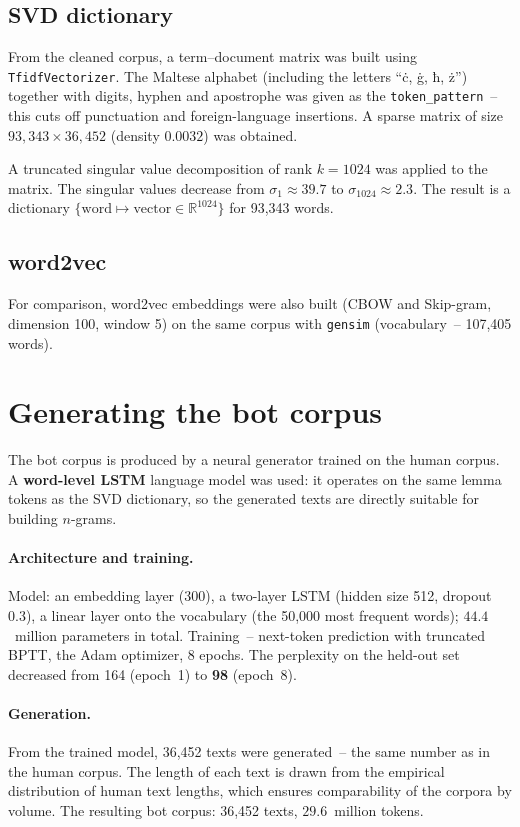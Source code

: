 \documentclass[12pt,a4paper]{article}
\begin{document}
\subsection{SVD dictionary}

From the cleaned corpus, a term--document matrix was built using
\texttt{TfidfVectorizer}. The Maltese alphabet (including the letters
``ċ, ġ, ħ, ż'') together with digits, hyphen and apostrophe was given as
the \texttt{token\_pattern}~-- this cuts off punctuation and foreign-language
insertions. A sparse matrix of size $93{,}343\times36{,}452$ (density $0.0032$)
was obtained.

A truncated singular value decomposition of rank $k=1024$ was applied to the
matrix. The singular values decrease from $\sigma_1\approx39.7$ to
$\sigma_{1024}\approx2.3$. The result is a dictionary
$\{\text{word}\mapsto\text{vector}\in\mathbb{R}^{1024}\}$ for 93{,}343 words.

\subsection{word2vec}

For comparison, word2vec embeddings were also built (CBOW and Skip-gram,
dimension 100, window 5) on the same corpus with \texttt{gensim}
(vocabulary~-- 107{,}405 words).

\section{Generating the bot corpus}

The bot corpus is produced by a neural generator trained on the human corpus. A
\textbf{word-level LSTM} language model was used: it operates on the same
lemma tokens as the SVD dictionary, so the generated texts are directly suitable
for building $n$-grams.

\paragraph{Architecture and training.} Model: an embedding layer (300), a
two-layer LSTM (hidden size 512, dropout $0.3$), a linear layer onto the
vocabulary (the 50{,}000 most frequent words); $44.4$~million parameters in
total. Training~-- next-token prediction with truncated BPTT, the Adam
optimizer, 8 epochs. The perplexity on the held-out set decreased from 164
(epoch~1) to \textbf{98} (epoch~8).

\paragraph{Generation.} From the trained model, 36{,}452 texts were
generated~-- the same number as in the human corpus. The length of each text is
drawn from the empirical distribution of human text lengths, which ensures
comparability of the corpora by volume. The resulting bot corpus: 36{,}452
texts, $29.6$~million tokens.
\end{document}
